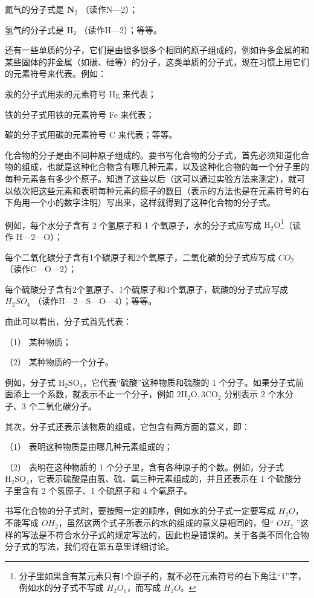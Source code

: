 氮气的分子式是 \(\mathbf{N}_2\) （读作N---2）；

氢气的分子式是 \(\mathrm{H}_{2}\) （读作H---2）；等等。

还有一些单质的分子，它们是由很多很多个相同的原子组成的，例如许多金属的和某些固体的非金属（如碳、硅等）的分子，这类单质的分子式，现在习惯上用它们的元素符号来代表。例如：

汞的分子式用汞的元素符号 Hg 来代表；

铁的分子式用铁的元素符号 Fe 来代表；

碳的分子式用碳的元素符号 C 来代表；等等。

化合物的分子是由不同种原子组成的。要书写化合物的分子式，首先必须知道化合物的组成，也就是这种化合物含有哪几种元素，以及这种化合物的每一个分子里的每种元素各有多少个原子。知道了这些以后（这可以通过实验方法来测定），就可以依次把这些元素和表明每种元素的原子的数目（表示的方法也是在元素符号的右下角用一个小的数字注明）写出来，这样就得到了这种化合物的分子式。

例如，每个水分子含有 2 个氢原子和 1 个氧原子，水的分子式应写成
\(\mathrm{H}_{2} \mathrm{O}\)\footnote{分子里如果含有某元素只有1个原子的，就不必在元素符号的右下角注``1''字，例如水的分子式不写成
  \(H_{2}O_{1}\)，而写成 \(H_{2}O\)。}（读作 H---2---O）；

每个二氧化碳分子含有1个碳原子和2个氧原子，二氧化碳的分子式应写成
\(CO_{2}\) （读作C---O---2）；

每个硫酸分子含有2个氢原子、1个硫原子和4个氧原子，硫酸的分子式应写成
\(H_{2}SO_{4}\) （读作H---2---S---O---4）；等等。

由此可以看出，分子式首先代表：

（1） 某种物质；

（2） 某种物质的一个分子。

例如，分子式
\(\mathrm{H}_{2} \mathrm{SO}_{4}\)，它代表``硫酸''这种物质和硫酸的 1
个分子。如果分子式前面添上一个系数，就表示不止一个分子，例如
\(2 \mathrm{H}_{2} \mathrm{O}, 3 \mathrm{CO}_{2}\) 分别表示 2
个水分子、3 个二氧化碳分子。

其次，分子式还表示该物质的组成，它包含有两方面的意义，即：

（1） 表明这种物质是由哪几种元素组成的；

（2） 表明在这种物质的 1 个分子里，含有各种原子的个数。例如，分子式
\(\mathrm{H}_{2} \mathrm{SO}_{4}\)，它表示硫酸是由氢、硫、氧三种元素组成的，并且还表示在
1 个硫酸分子里含有 2 个氢原子、1 个硫原子和 4 个氧原子。

书写化合物的分子式时，要按照一定的顺序，例如水的分子式一定要写成
\(H_{2}O\)，不能写成
\(OH_{2}\)，虽然这两个式子所表示的水的组成的意义是相同的，但``
\(OH_{2}\)
''这样的写法是不符合水分子式的规定写法的，因此也是错误的。关于各类不同化合物分子式的写法，我们将在第五章里详细讨论。

